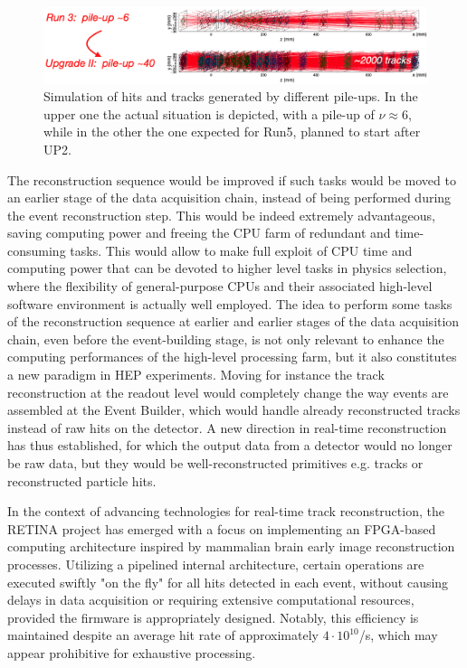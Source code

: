 \begin{figure}
    \centering
    \includegraphics[width=\textwidth]{figures/VELO_pile-up.png}
    \caption{Simulation of hits and tracks generated by different pile-ups. In the upper one the actual situation is depicted, with a pile-up of $\nu\approx 6$, while in the other the one expected for Run5, planned to start after UP2.}
    \label{fig:velo_pile-up}
\end{figure}

The reconstruction sequence would be improved if such tasks would be moved to an earlier stage of the data acquisition chain, instead of being performed during the event reconstruction step. This would be indeed extremely advantageous, saving computing power and freeing the CPU farm of redundant and time-consuming tasks. This would allow to make full exploit of CPU time and computing power that can be devoted to higher level tasks in physics selection, where the flexibility of general-purpose CPUs and their associated high-level software environment is actually well employed.
The idea to perform some tasks of the reconstruction sequence at earlier and earlier stages of the data acquisition chain, even before the event-building stage, is not only relevant to enhance the computing performances of the high-level processing farm, but it also constitutes a new paradigm in HEP experiments. Moving for instance the track reconstruction at the readout level would completely change the way events are assembled at the Event Builder, which would handle already reconstructed tracks instead of raw hits on the detector. A new direction in real-time reconstruction has thus established, for which the output data from a detector would no longer be raw data, but they would be well-reconstructed primitives e.g. tracks or reconstructed particle hits.

In the context of advancing technologies for real-time track reconstruction, the RETINA\cite{refId0} project has emerged with a focus on implementing an FPGA-based computing architecture inspired by  mammalian brain early image reconstruction processes. Utilizing a pipelined internal architecture, certain operations are executed swiftly "on the fly" for all hits detected in each event, without causing delays in data acquisition or requiring extensive computational resources, provided the firmware is appropriately designed. Notably, this efficiency is maintained despite an average hit rate of approximately $4 \cdot 10^{10}$/s, which may appear prohibitive for exhaustive processing.

